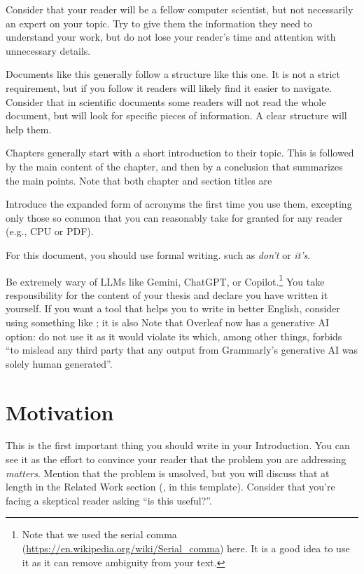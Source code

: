 Consider that your reader will be a fellow computer scientist, but not necessarily an expert
on your topic. Try to give them the information they need to understand your work, but
do not lose your reader's time and attention with unnecessary details.

Documents like this generally follow a structure like this one. It is not a strict
requirement, but if you follow it readers will likely find it easier to navigate.
Consider that in scientific documents some readers will not read the whole document,
but will look for specific pieces of information. A clear structure will help them.

Chapters generally start with a short introduction to their topic. This is followed by the main content of the chapter, and then by a conclusion
that summarizes the main points. Note that both chapter and section titles are

Introduce the expanded form of acronyms the first time you use them, excepting only those so common that you can reasonably take for granted for any reader (e.g., CPU or PDF).

For this document, you should use formal writing.  such as \emph{don't} or \emph{it's}.

Be extremely wary of \acp{LLM} like Gemini, ChatGPT, or
Copilot.\footnote{Note that we used the serial comma (\url{https://en.wikipedia.org/wiki/Serial_comma}) here. It is a good idea to use it as it can remove ambiguity from your text.} You take
responsibility for the content of your thesis and declare you have written it yourself.
If you want a tool that helps you to write in better English, consider using something like
; it is also  Note that Overleaf now has a generative AI option: do not use it as it would violate its  which, among other things, forbids ``to mislead any third party that any output from Grammarly’s generative AI was solely human generated''.

\section{Motivation}

This is the first important thing you should write in your Introduction.
You can see it as the effort to convince your reader that the problem you are addressing
\emph{matters}. Mention that the problem is unsolved, but you will discuss that at
length in the Related Work section (, in this template). Consider that
you're facing a skeptical reader asking ``is this useful?''.

